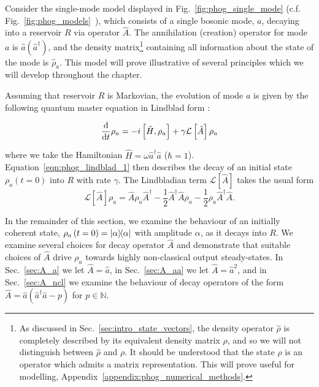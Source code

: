 Consider the single-mode model displayed in Fig.~\ref{fig:phog_single_mode} (c.f. Fig.~\ref{fig:phog_models}~), which consists of a single bosonic mode, $a$, decaying into a reservoir $R$ via operator $\hat{A}$. The annihilation (creation) operator for mode $a$ is $\hat{a} \left(\hat{a}^\dagger\right)$, and the density matrix\footnote{As discussed in Sec.~\ref{sec:intro_state_vectors}, the density operator $\hat{\rho}$ is completely described by its equivalent density matrix $\rho$, and so we will not distinguish between $\hat{\rho}$ and $\rho$. It should be understood that the state $\rho$ is an operator which admits a matrix representation. This will prove useful for modelling, Appendix~\ref{appendix:phog_numerical_methods}.} containing all information about the state of the mode is $\hat{\rho}_a$. This model will prove illustrative of several principles which we will develop throughout the chapter. 

Assuming that reservoir $R$ is Markovian, the evolution of mode $a$ is given by the following quantum master equation in Lindblad form \cite{Carmichael1999a, Breuer2002}:


\begin{equation}\label{eqn:phog_lindblad_1}
\frac{\mathrm{d}}{\mathrm{d}t} \rho_a =  - i \left[\hat{H}, \rho_a\right] + \gamma \mathcal{L}\left[\hat{A}\right]\rho_a
\end{equation}

\noindent where we take the Hamiltonian $\hat{H} =  \omega \hat{a}^\dagger \hat{a}$ ($\hbar = 1$). Equation~\ref{eqn:phog_lindblad_1} then describes the decay of an initial state $\rho_a\left(t=0\right)$ into $R$ with rate $\gamma$. The Lindbladian term $\mathcal{L}\left[\hat{A}\right]$ takes the usual form %
\begin{equation}\label{eqn:phog_lindbladian_form}
\mathcal{L}\left[\hat{A}\right]\rho_a = \hat{A}\rho_a\hat{A}^\dagger - \frac{1}{2} \hat{A}^\dagger \hat{A} \rho_a - \frac{1}{2} \rho_a \hat{A}^\dagger \hat{A}.
\end{equation}

\noindent In the remainder of this section, we examine the behaviour of an initially coherent state, $\rho_a\left(t=0\right) = \dyad{\alpha}$ with amplitude $\alpha$, as it decays into $R$. We examine several choices for decay operator $\hat{A}$ and demonstrate that suitable choices of $\hat{A}$ drive $\rho_a$ towards highly non-classical output steady-states. In Sec.~\ref{sec:A_a} we let $\hat{A} = \hat{a}$, in Sec.~\ref{sec:A_aa} we let $\hat{A} = \hat{a}^2$, and in Sec.~\ref{sec:A_ncl} we examine the behaviour of decay operators of the form $\hat{A} = \hat{a} \left(\hat{a}^\dagger \hat{a} - p\right)$ for $p \in \mathbb{N}$.



